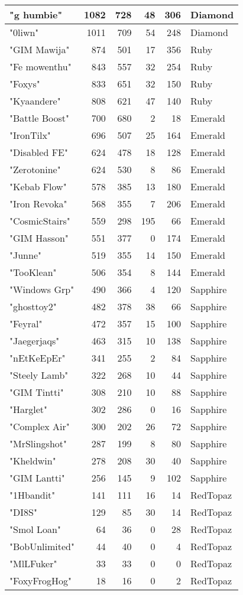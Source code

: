 \documentclass{article}
\begin{document}
\begin{table}[htbp]
\begin{tabular}{|l|r|r|r|r|l|}
"g humbie" & 1082 & 728 & 48 & 306 & Diamond \\ \hline
"0liwn" & 1011 & 709 & 54 & 248 & Diamond \\ \hline
"GIM Mawija" & 874 & 501 & 17 & 356 & Ruby \\ \hline
"Fe mowenthu" & 843 & 557 & 32 & 254 & Ruby \\ \hline
"Foxys" & 833 & 651 & 32 & 150 & Ruby \\ \hline
"Kyaandere" & 808 & 621 & 47 & 140 & Ruby \\ \hline
"Battle Boost" & 700 & 680 & 2 & 18 & Emerald \\ \hline
"IronTilx" & 696 & 507 & 25 & 164 & Emerald \\ \hline
"Disabled FE" & 624 & 478 & 18 & 128 & Emerald \\ \hline
"Zerotonine" & 624 & 530 & 8 & 86 & Emerald \\ \hline
"Kebab Flow" & 578 & 385 & 13 & 180 & Emerald \\ \hline
"Iron Revoka" & 568 & 355 & 7 & 206 & Emerald \\ \hline
"CosmicStairs" & 559 & 298 & 195 & 66 & Emerald \\ \hline
"GIM Hasson" & 551 & 377 & 0 & 174 & Emerald \\ \hline
"Junne" & 519 & 355 & 14 & 150 & Emerald \\ \hline
"TooKlean" & 506 & 354 & 8 & 144 & Emerald \\ \hline
"Windows Grp" & 490 & 366 & 4 & 120 & Sapphire \\ \hline
"ghosttoy2" & 482 & 378 & 38 & 66 & Sapphire \\ \hline
"Feyral" & 472 & 357 & 15 & 100 & Sapphire \\ \hline
"Jaegerjaqs" & 463 & 315 & 10 & 138 & Sapphire \\ \hline
"nEtKeEpEr" & 341 & 255 & 2 & 84 & Sapphire \\ \hline
"Steely Lamb" & 322 & 268 & 10 & 44 & Sapphire \\ \hline
"GIM Tintti" & 308 & 210 & 10 & 88 & Sapphire \\ \hline
"Harglet" & 302 & 286 & 0 & 16 & Sapphire \\ \hline
"Complex Air" & 300 & 202 & 26 & 72 & Sapphire \\ \hline
"MrSlingshot" & 287 & 199 & 8 & 80 & Sapphire \\ \hline
"Kheldwin" & 278 & 208 & 30 & 40 & Sapphire \\ \hline
"GIM Lantti" & 256 & 145 & 9 & 102 & Sapphire \\ \hline
"1Hbandit" & 141 & 111 & 16 & 14 & RedTopaz \\ \hline
"DI8S" & 129 & 85 & 30 & 14 & RedTopaz \\ \hline
"Smol Loan" & 64 & 36 & 0 & 28 & RedTopaz \\ \hline
"BobUnlimited" & 44 & 40 & 0 & 4 & RedTopaz \\ \hline
"MlLFuker" & 33 & 33 & 0 & 0 & RedTopaz \\ \hline
"FoxyFrogHog" & 18 & 16 & 0 & 2 & RedTopaz \\ \hline
\end{tabular}
\end{table}
\end{document}
